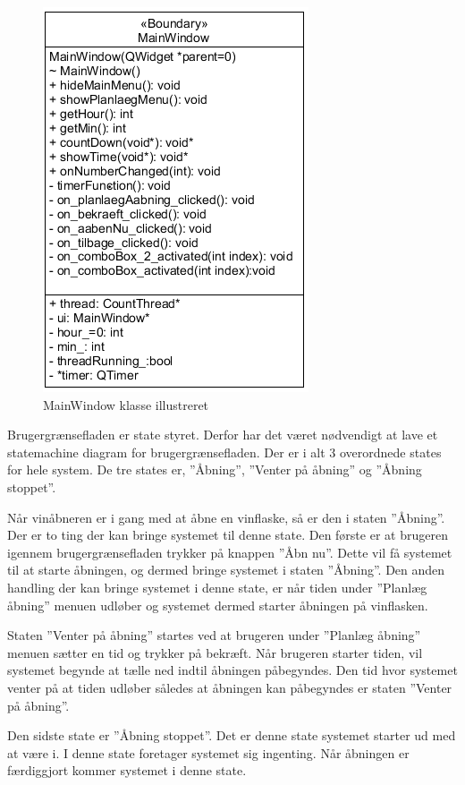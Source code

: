 \begin{figure}[H]
	\centerline{\includegraphics[scale=1]{tex/Design/GUI/Fotos/MainWindow}}
	\caption{MainWindow klasse illustreret}
	\label{MW_CD}
\end{figure}

Brugergrænsefladen er state styret. Derfor har det været nødvendigt at lave et statemachine diagram for brugergrænsefladen. Der er i alt 3 overordnede states for hele system. De tre states er, ”Åbning”, ”Venter på åbning” og ”Åbning stoppet”.

Når vinåbneren er i gang med at åbne en vinflaske, så er den i staten ”Åbning”. Der er to ting der kan bringe systemet til denne state. Den første er at brugeren igennem brugergrænsefladen trykker på knappen ”Åbn nu”. Dette vil få systemet til at starte åbningen, og dermed bringe systemet i staten ”Åbning”. Den anden handling der kan bringe systemet i denne state, er når tiden under ”Planlæg åbning” menuen udløber og systemet dermed starter åbningen på vinflasken. 

Staten ”Venter på åbning” startes ved at brugeren under ”Planlæg åbning” menuen sætter en tid og trykker på bekræft. Når brugeren starter tiden, vil systemet begynde at tælle ned indtil åbningen påbegyndes. Den tid hvor systemet venter på at tiden udløber således at åbningen kan påbegyndes er staten ”Venter på åbning”.

Den sidste state er ”Åbning stoppet”. Det er denne state systemet starter ud med at være i. I denne state foretager systemet sig ingenting. Når åbningen er færdiggjort kommer systemet i denne state.